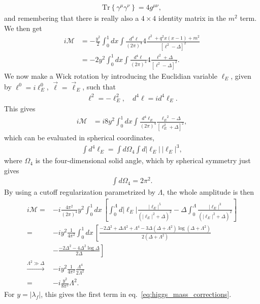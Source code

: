 \documentclass[twoside,english]{uiofysmaster}
\begin{document}
\begin{align}
	\mathrm{Tr} \left\{ \gamma^\mu \gamma^\nu\right\} = 4g^{\mu\nu},
\end{align}
and remembering that there is really also a $4\times 4$ identity matrix in the $m^2$ term. We then get
\begin{align}
	i\mathcal{M} &= -\frac{y^2}{2}\int_0^1 dx \int \frac{d^4\ell}{(2\pi)^4} 4 \frac{ {\ell}^2 + {q}^2x(x-1) + m^2}{\left[ \ell^2 - \Delta \right]^2}  \\
				&= -2y^2\int_0^1 dx \int \frac{d^4\ell}{(2\pi)^4} 4 \frac{ {\ell}^2 + \Delta}{\left[ \ell^2 - \Delta \right]^2}.\nonumber
\end{align}
We now make a Wick rotation by introducing the Euclidian variable $\ell_E$, given by $\ell^0 = i\ell^0_E$, $\vec\ell = \vec\ell_E$, such that
\begin{align}
	\ell^2 = -\ell_E^2, \quad d^4\ell = id^4\ell_E.
\end{align}
This gives
\begin{align}
	i\mathcal{M} &= i8y^2\int_0^1 dx \int \frac{d^4\ell_E}{(2\pi)^4}  \frac{ {\ell_E}^2 - \Delta}{\left[ \ell_E^2 + \Delta \right]^2}, 
\end{align}
which can be evaluated in spherical coordinates,
\begin{align}
	\int d^4\ell_E = \int d\Omega_4 \int d|\ell_E| \, |\ell_E|^3,
\end{align}
where $\Omega_4$ is the four-dimensional solid angle, which by spherical symmetry just gives
\begin{align}
	 \int d\Omega_4 = 2\pi^2.
\end{align}
By using a cutoff regularization parametrized by $\Lambda$, the whole amplitude is then
\begin{align}
	i\mathcal{M} = &-i\frac{4\pi^2}{(2\pi)^4}y^2 \int_0^1 dx\, \left[ \int_0^\Lambda d|\ell_E| \frac{|\ell_E|^5}{\left(|\ell_E|^2 + \Delta\right)^2} - \Delta \int_0^\Lambda \frac{|\ell_E|^3}{\left( |\ell_E|^2 + \Delta \right)^2}\right]\nonumber \\
	= &-iy^2\frac{1}{4\pi^2}\int_0^1 dx \, \left[ \frac{-2\Delta^2 + \Delta \Lambda^2 + \Lambda^4 - 3\Delta\left( \Delta + \Lambda^2\right)\log \left(\Delta + \Lambda^2\right)}{2\left(\Delta + \Lambda^2\right)} \right.\nonumber \\
	&-\left. \frac{-2\Delta^2 - 4\Delta^2\log\Delta}{2\Delta}\right]\\
	\overset{\Lambda^2 \gg \Delta}{\to} &-iy^2\frac{1}{4\pi^2} \frac{\Lambda^4}{2\Lambda^2}\nonumber \\
	= &-i\frac{y^2}{8\pi^2}\Lambda^2.\nonumber
\end{align}
For $y = |\lambda_f|$, this gives the first term in eq.\ \eqref{eq:higgs_mass_corrections}.
\end{document}
